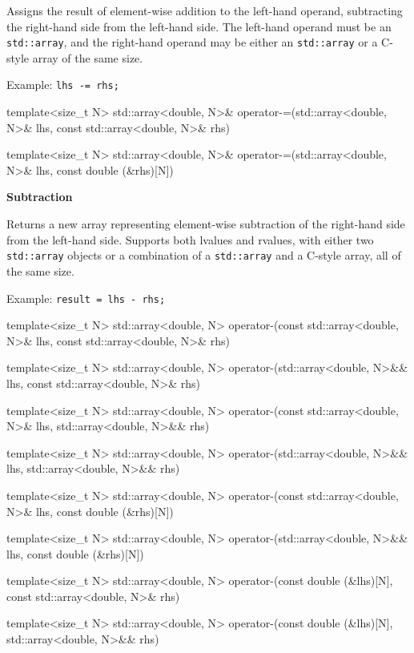\documentclass[11pt,fleqn]{report}
\begin{document}
Assigns the result of element-wise addition to the left-hand operand, 
subtracting the right-hand side from the left-hand side.
The left-hand operand must be an \texttt{std::array}, and the right-hand 
operand may be either an \texttt{std::array} or a C-style array 
of the same size.

Example: \texttt{lhs -= rhs;} 
\begin{code}
template<size_t N>
std::array<double, N>& operator-=(std::array<double, N>& lhs, 
                                  const std::array<double, N>& rhs)

template<size_t N>
std::array<double, N>& operator-=(std::array<double, N>& lhs, 
                                  const double (&rhs)[N])
\end{code}

\textbf{Subtraction}  

Returns a new array representing element-wise subtraction
of the right-hand side from the left-hand side.
Supports both lvalues and rvalues, with either two \texttt{std::array} objects or
a combination of a \texttt{std::array} and a C-style array, all of the same size.

Example: \texttt{result = lhs - rhs;}  
\begin{code}
template<size_t N>
std::array<double, N> operator-(const std::array<double, N>& lhs, 
                                const std::array<double, N>& rhs)

template<size_t N>
std::array<double, N> operator-(std::array<double, N>&& lhs, 
                                const std::array<double, N>& rhs)

template<size_t N>
std::array<double, N> operator-(const std::array<double, N>& lhs, 
                                std::array<double, N>&& rhs)

template<size_t N>
std::array<double, N> operator-(std::array<double, N>&& lhs, 
                                std::array<double, N>&& rhs)

template<size_t N>
std::array<double, N> operator-(const std::array<double, N>& lhs, 
                                const double (&rhs)[N])

template<size_t N>
std::array<double, N> operator-(std::array<double, N>&& lhs, 
                                const double (&rhs)[N])

template<size_t N>
std::array<double, N> operator-(const double (&lhs)[N], 
                                const std::array<double, N>& rhs)

template<size_t N>
std::array<double, N> operator-(const double (&lhs)[N], 
                                std::array<double, N>&& rhs)
\end{code}
\end{document}
